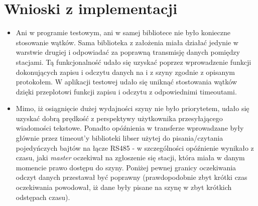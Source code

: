 \documentclass[a4paper,12pt]{article}
\begin{document}
\section{Wnioski z implementacji}

\begin{itemize}
  \item Ani w programie testowym, ani w samej bibliotece nie było konieczne
        stosowanie wątków. Sama biblioteka z założenia miała działać jedynie w
        warstwie drugiej i odpowiadać za poprawną transmisję danych pomiędzy
        stacjami. Tą funkcjonalność udało się uzyskać poprzez wprowadzenie
        funkcji dokonujących zapisu i odczytu danych na i z szyny zgodnie z
        opisanym protokołem. W aplikacji testowej udało się uniknąć stostowania
        wątków dzięki przeplotowi funkcji zapisu i odczytu z odpowiednimi
        timeoutami.
  \item Mimo, iż osiągnięcie dużej wydajności szyny nie było priorytetem, udało
        się uzyskać dobrą prędkość z perspektywy użytkownika przesyłającego
        wiadomości tekstowe. Ponadto opóźnienia w transferze wprowadzane były
        głównie przez timeout'y biblioteki libser użytej do pisania/czytania
        pojedyńczych bajtów na łącze RS485 - w szczególności opóźnienie
        wynikało z czasu, jaki \emph{master} oczekiwał na zgłoszenie się
        stacji, która miała w danym momencie prawo dostępu do szyny. Poniżej
        pewnej granicy oczekiwania odczyt danych przestawał być poprawny
        (prawdopodobnie zbyt krótki czas oczekiwania powodował, iż dane były
        pisane na szynę w zbyt krótkich odstępach czasu).
\end{itemize}
\end{document}
